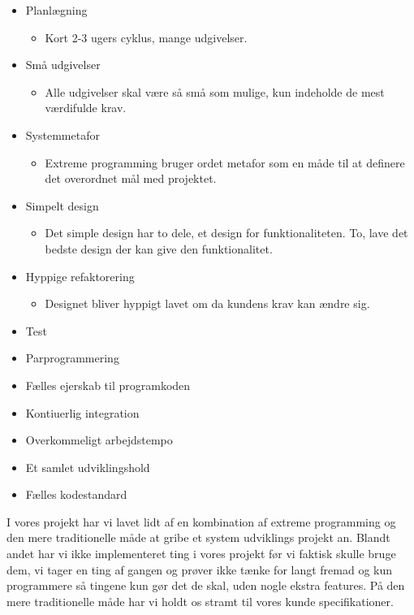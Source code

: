 \documentclass[12pt,a4paper]{article}
\begin{document}
\begin{itemize}
	\item Planlægning
		\begin{itemize}
			\item Kort 2-3 ugers cyklus, mange udgivelser.
		\end{itemize}
	\item Små udgivelser
		\begin{itemize}
			\item Alle udgivelser skal være så små som mulige, kun indeholde de mest værdifulde krav.
		\end{itemize}
	\item Systemmetafor
		\begin{itemize}
			\item Extreme programming bruger ordet metafor som en måde til at definere det overordnet mål med projektet.
		\end{itemize}
	\item Simpelt design
		\begin{itemize}
			\item Det simple design har to dele, et design for funktionaliteten. To, lave det bedste design der kan give den funktionalitet. 
		\end{itemize}
	\item Hyppige refaktorering
		\begin{itemize}
			\item Designet bliver hyppigt lavet om da kundens krav kan ændre sig.
		\end{itemize}
	\item Test
	\item Parprogrammering
	\item Fælles ejerskab til programkoden
	\item Kontiuerlig integration
	\item Overkommeligt arbejdstempo
	\item Et samlet udviklingshold
	\item Fælles kodestandard
\end{itemize}
I vores projekt har vi lavet lidt af en kombination af extreme programming og den mere traditionelle måde at gribe et system udviklings projekt an. Blandt andet har vi ikke implementeret ting i vores projekt før vi faktisk skulle bruge dem, vi tager en ting af gangen og prøver ikke tænke for langt fremad og kun programmere så tingene kun gør det de skal, uden nogle ekstra features. På den mere traditionelle måde har vi holdt os stramt til vores kunde specifikationer.
\end{document}

